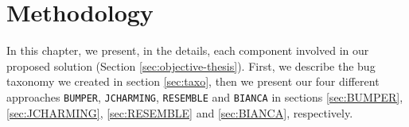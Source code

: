 
\chapter{Methodology\label{chap:methodology}}

In this chapter, we present, in the details, each component involved in our proposed solution (Section \ref{sec:objective-thesis}). First, we describe the bug taxonomy we created in section \ref{sec:taxo}, then we present our four different approaches {\tt BUMPER}, {\tt JCHARMING}, {\tt RESEMBLE} and {\tt BIANCA} in sections \ref{sec:BUMPER}, \ref{sec:JCHARMING}, \ref{sec:RESEMBLE} and \ref{sec:BIANCA}, respectively.






